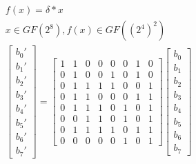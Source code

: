 \begin{equation}
\begin{gathered}
\label{eq:iso_map}
f(x) = \delta * x\\
x \in GF(2^8), f(x) \in GF((2^4)^2) \\
\begin{bmatrix}
b_0'\\b_1'\\b_2'\\b_3'\\b_4'\\b_5'\\b_6'\\b_7'
\end{bmatrix}
=
\begin{bmatrix}
    1 & 1 & 0 & 0 & 0 & 0 & 1 & 0 \\
    0 & 1 & 0 & 0 & 1 & 0 & 1 & 0 \\
    0 & 1 & 1 & 1 & 1 & 0 & 0 & 1 \\
    0 & 1 & 1 & 0 & 0 & 0 & 1 & 1 \\
    0 & 1 & 1 & 1 & 0 & 1 & 0 & 1 \\
    0 & 0 & 1 & 1 & 0 & 1 & 0 & 1 \\
    0 & 1 & 1 & 1 & 1 & 0 & 1 & 1 \\
    0 & 0 & 0 & 0 & 0 & 1 & 0 & 1
\end{bmatrix}
\begin{bmatrix}
b_0\\b_1\\b_2\\b_3\\b_4\\b_5\\b_6\\b_7
\end{bmatrix}
\end{gathered}
\end{equation}

